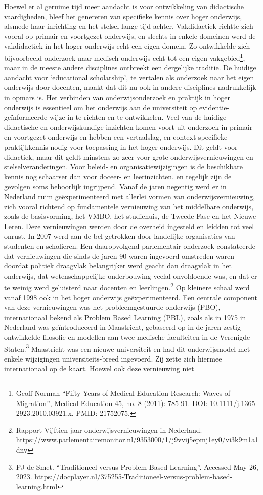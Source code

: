 \documentclass[empirical, authordate, ]{new-jote-article}
\begin{document}
	Hoewel er al geruime tijd meer aandacht is voor ontwikkeling van didactische vaardigheden, bleef het genereren van specifieke kennis over hoger onderwijs, alsmede haar inrichting en het stelsel lange tijd achter. Vakdidactiek richtte zich vooral op primair en voortgezet onderwijs, en slechts in enkele domeinen werd de vakdidactiek in het hoger onderwijs echt een eigen domein. Zo ontwikkelde zich bijvoorbeeld onderzoek naar medisch onderwijs echt tot een eigen vakgebied\footnote{Geoff Norman “Fifty Years of Medical Education Research: Waves of Migration”, Medical Education 45, no. 8 (2011): 785-91. DOI: 10.1111/j.1365-2923.2010.03921.x. PMID: 21752075.}, maar in de meeste andere disciplines ontbreekt een dergelijke traditie. De huidige aandacht voor ‘educational scholarship', te vertalen als onderzoek naar het eigen onderwijs door docenten, maakt dat dit nu ook in andere disciplines nadrukkelijk in opmars is. Het verbinden van onderwijsonderzoek en praktijk in hoger onderwijs is essentieel om het onderwijs aan de universiteit op evidentie-geïnformeerde wijze in te richten en te ontwikkelen. Veel van de huidige didactische en onderwijskundige inzichten komen voort uit onderzoek in primair en voortgezet onderwijs en hebben een vertaalslag, en context-specifieke praktijkkennis nodig voor toepassing in het hoger onderwijs. Dit geldt voor didactiek, maar dit geldt minstens zo zeer voor grote onderwijsvernieuwingen en stelselveranderingen. Voor beleid- en organisatiewijzigingen is de beschikbare kennis nog schaarser dan voor doceer- en leerinzichten, en tegelijk zijn de gevolgen soms behoorlijk ingrijpend. Vanaf de jaren negentig werd er in Nederland ruim geëxperimenteerd met allerlei vormen van onderwijsvernieuwing, zich vooral richtend op fundamentele vernieuwing van het middelbare onderwijs, zoals de basisvorming, het VMBO, het studiehuis, de Tweede Fase en het Nieuwe Leren. Deze vernieuwingen werden door de overheid ingesteld en leidden tot veel onrust. In 2007 werd aan de bel getrokken door landelijke organisaties van studenten en scholieren. Een daaropvolgend parlementair onderzoek constateerde dat vernieuwingen die sinds de jaren 90 waren ingevoerd omstreden waren doordat politiek draagvlak belangrijker werd geacht dan draagvlak in het onderwijs, dat wetenschappelijke onderbouwing veelal onvoldoende was, en dat er te weinig werd geluisterd naar docenten en leerlingen.\footnote{Rapport Vijftien jaar onderwijsvernieuwingen in Nederland. https://www.parlementairemonitor.nl/9353000/1/j9vvij5epmj1ey0/vi3k9m1a1dnv} Op kleinere schaal werd vanaf 1998 ook in het hoger onderwijs geëxperimenteerd. Een centrale component van deze vernieuwingen was het probleemgestuurde onderwijs (PBO), internationaal bekend als Problem Based Learning (PBL), zoals als in 1975 in Nederland was geïntroduceerd in Maastricht, gebaseerd op in de jaren zestig ontwikkelde filosofie en modellen aan twee medische faculteiten in de Verenigde Staten.\footnote{PJ de Smet. “Traditioneel versus Problem-Based Learning”. Accessed May 26, 2023. https://docplayer.nl/375255-Traditioneel-versus-problem-based-learning.html} Maastricht was een nieuwe universiteit en had dit onderwijsmodel met enkele wijzigingen universiteits-breed ingevoerd. Zij zette zich hiermee internationaal op de kaart. Hoewel ook deze vernieuwing niet 
\end{document}
